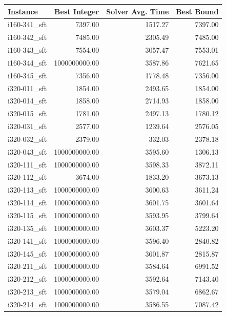 \begin{tabular}{lrrr}
\toprule
Instance &  Best Integer &  Solver Avg. Time &  Best Bound \\
\midrule
i160-341\_sft &       7397.00 &           1517.27 &     7397.00 \\
i160-342\_sft &       7485.00 &           2305.49 &     7485.00 \\
i160-343\_sft &       7554.00 &           3057.47 &     7553.01 \\
i160-344\_sft & 1000000000.00 &           3587.86 &     7621.65 \\
i160-345\_sft &       7356.00 &           1778.48 &     7356.00 \\
i320-011\_sft &       1854.00 &           2493.65 &     1854.00 \\
i320-014\_sft &       1858.00 &           2714.93 &     1858.00 \\
i320-015\_sft &       1781.00 &           2497.13 &     1780.12 \\
i320-031\_sft &       2577.00 &           1239.64 &     2576.05 \\
i320-032\_sft &       2379.00 &            332.03 &     2378.18 \\
i320-043\_sft & 1000000000.00 &           3595.60 &     1306.13 \\
i320-111\_sft & 1000000000.00 &           3598.33 &     3872.11 \\
i320-112\_sft &       3674.00 &           1833.20 &     3673.13 \\
i320-113\_sft & 1000000000.00 &           3600.63 &     3611.24 \\
i320-114\_sft & 1000000000.00 &           3601.75 &     3601.64 \\
i320-115\_sft & 1000000000.00 &           3593.95 &     3799.64 \\
i320-135\_sft & 1000000000.00 &           3603.37 &     5223.20 \\
i320-141\_sft & 1000000000.00 &           3596.40 &     2840.82 \\
i320-145\_sft & 1000000000.00 &           3601.87 &     2815.87 \\
i320-211\_sft & 1000000000.00 &           3584.64 &     6991.52 \\
i320-212\_sft & 1000000000.00 &           3592.64 &     7143.40 \\
i320-213\_sft & 1000000000.00 &           3579.04 &     6862.67 \\
i320-214\_sft & 1000000000.00 &           3586.55 &     7087.42 \\

\end{tabular}
